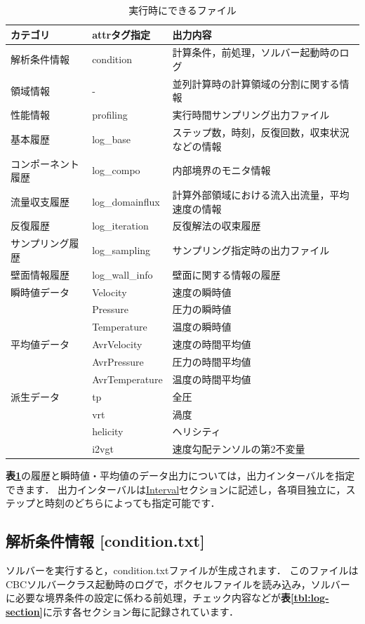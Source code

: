 \begin{table}[htdp]
\caption{実行時にできるファイル}
\begin{center}
\small
\begin{tabular}{lll}\toprule
カテゴリ & attrタグ指定 & 出力内容\\ \midrule
解析条件情報 & condition & 計算条件，前処理，ソルバー起動時のログ\\
領域情報 & - & 並列計算時の計算領域の分割に関する情報\\ 
性能情報 & profiling & 実行時間サンプリング出力ファイル\\ \hline
基本履歴 & log\_base & ステップ数，時刻，反復回数，収束状況などの情報\\
コンポーネント履歴 & log\_compo & 内部境界のモニタ情報\\
流量収支履歴 & log\_domainflux & 計算外部領域における流入出流量，平均速度の情報\\
反復履歴 & log\_iteration & 反復解法の収束履歴\\ 
サンプリング履歴 & log\_sampling & サンプリング指定時の出力ファイル\\ 
壁面情報履歴 & log\_wall\_info & 壁面に関する情報の履歴\\ \hline
瞬時値データ & Velocity & 速度の瞬時値\\
& Pressure & 圧力の瞬時値\\
& Temperature & 温度の瞬時値\\
平均値データ & AvrVelocity & 速度の時間平均値\\
& AvrPressure & 圧力の時間平均値\\
& AvrTemperature & 温度の時間平均値\\
派生データ & tp & 全圧\\
& vrt & 渦度\\
& helicity & ヘリシティ\\
& i2vgt & 速度勾配テンソルの第2不変量\\ 
\bottomrule
\end{tabular}
\end{center}
\label{tbl:logfiles}
\end{table}

\textbf{表\ref{tbl:logfiles}}の履歴と瞬時値・平均値のデータ出力については，出力インターバルを指定できます．
出力インターバルは\hyperlink{tgt:interval}{Interval}セクションに記述し，各項目独立に，ステップと時刻のどちらによっても指定可能です．

%
\pagebreak
\subsection{解析条件情報 [condition.txt]}
\label{sec:condition.txt}
ソルバーを実行すると，condition.txtファイルが生成されます．
このファイルはCBCソルバークラス起動時のログで，ボクセルファイルを読み込み，ソルバーに必要な境界条件の設定に係わる前処理，チェック内容などが\textbf{表\ref{tbl:log-section}}に示す各セクション毎に記録されています．

